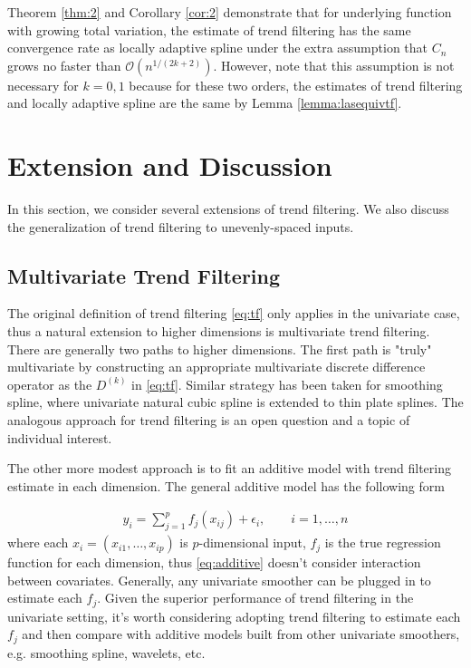 \documentclass[a4paper]{article}
\renewcommand{\cal}{\mathcal}
\begin{document}
Theorem \ref{thm:2} and Corollary \ref{cor:2} demonstrate that for underlying function with growing total variation, the estimate of trend filtering has the same convergence rate as locally adaptive spline under the extra assumption that $C_n$ grows no faster than $\cal{O}(n^{1/(2k+2)})$. However, note that this assumption is not necessary for $k = 0, 1$ because for these two orders, the estimates of trend filtering and locally adaptive spline are the same by Lemma \ref{lemma:lasequivtf}.

\section{Extension and Discussion}
\label{sec:extension}
In this section, we consider several extensions of trend filtering. We also discuss the generalization of trend filtering to unevenly-spaced inputs. 

\subsection{Multivariate Trend Filtering}
The original definition of trend filtering \eqref{eq:tf} only applies in the univariate case, thus a natural extension to higher dimensions is multivariate trend filtering. There are generally two paths to higher dimensions. The first path is "truly" multivariate by constructing an appropriate multivariate discrete difference operator as the $D^{(k)}$ in \eqref{eq:tf}. Similar strategy has been taken for smoothing spline, where univariate natural cubic spline is extended to thin plate splines\cite{green1993nonparametric,wahba1990spline}. The analogous approach for trend filtering is an open question and a topic of individual interest.

The other more modest approach is to fit an additive model with trend filtering estimate in each dimension. The general additive model\cite{hastie1990generalized} has the following form

\begin{align}
y_i = \sum_{j=1}^pf_j(x_{ij}) + \epsilon_i, \qquad i=1,\ldots, n
\label{eq:additive}
\end{align}
where each $x_i=(x_{i1},\ldots, x_{ip})$ is $p$-dimensional input, $f_j$ is the true regression function for each dimension, thus \eqref{eq:additive} doesn't consider interaction between covariates. Generally, any univariate smoother can be plugged in to estimate each $f_j$. Given the superior performance of trend filtering in the univariate setting, it's worth considering adopting trend filtering to estimate each $f_j$ and then compare with additive models built from other univariate smoothers, e.g. smoothing spline, wavelets, etc.
\end{document}
